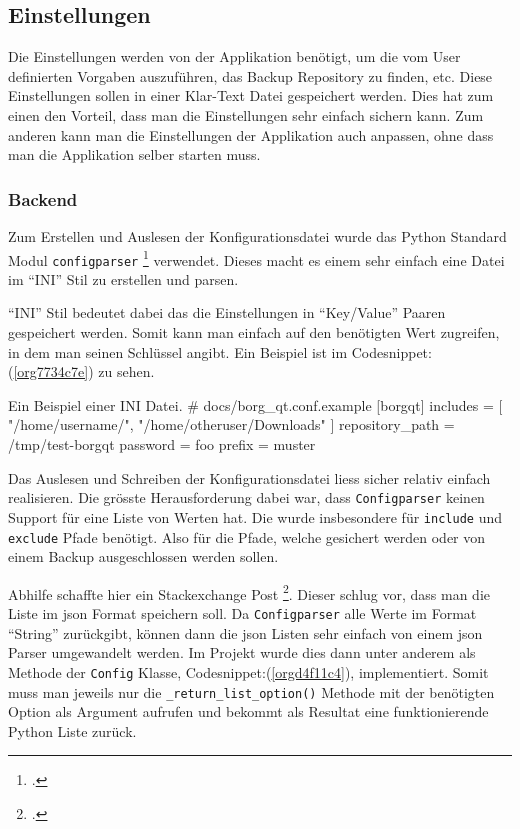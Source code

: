 \subsection{Einstellungen}
\label{sec:org9933429}

Die Einstellungen werden von der Applikation benötigt, um die vom User
definierten Vorgaben auszuführen, das Backup Repository zu finden, etc.
Diese Einstellungen sollen in einer Klar-Text Datei gespeichert werden. Dies
hat zum einen den Vorteil, dass man die Einstellungen sehr einfach sichern kann.
Zum anderen kann man die Einstellungen der Applikation auch anpassen, ohne dass
man die Applikation selber starten muss.

\subsubsection{Backend}
\label{sec:org93cdc4e}

Zum Erstellen und Auslesen der Konfigurationsdatei wurde das Python Standard
Modul \texttt{configparser} \footcite{configparser} verwendet. Dieses macht es einem
sehr einfach eine Datei im "`INI"' Stil zu erstellen und parsen.

"`INI"' Stil bedeutet dabei das die Einstellungen in "`Key/Value"' Paaren
gespeichert werden. Somit kann man einfach auf den benötigten Wert zugreifen, in
dem man seinen Schlüssel angibt. Ein Beispiel ist im Codesnippet:(\ref{org7734c7e}) zu sehen.

\begin{sexylisting}[label=org7734c7e]{Ein Beispiel einer INI Datei.}
# docs/borg_qt.conf.example
[borgqt]
includes = [
	    "/home/username/",
        "/home/otheruser/Downloads"
	]
repository_path = /tmp/test-borgqt
password = foo
prefix = muster
\end{sexylisting}

Das Auslesen und Schreiben der Konfigurationsdatei liess sicher relativ einfach
realisieren. Die grösste Herausforderung dabei war, dass \texttt{Configparser} keinen
Support für eine Liste von Werten hat. Die wurde insbesondere für \texttt{include} und
\texttt{exclude} Pfade benötigt. Also für die Pfade, welche gesichert werden oder von
einem  Backup ausgeschlossen werden sollen.

Abhilfe schaffte hier ein Stackexchange Post \footcite{configlist}. Dieser
schlug vor, dass man die Liste im \gls{json} Format speichern soll. Da
\texttt{Configparser} alle Werte im Format "`String"' zurückgibt, können dann
die \gls{json} Listen sehr einfach von einem \gls{json} Parser umgewandelt
werden. Im Projekt wurde dies dann unter anderem als Methode der
\texttt{Config} Klasse, Codesnippet:(\ref{orgd4f11c4}), implementiert. Somit
muss man jeweils nur die \texttt{\_return\_list\_option()} Methode mit der
benötigten Option als Argument aufrufen und bekommt als Resultat eine
funktionierende Python Liste zurück.


